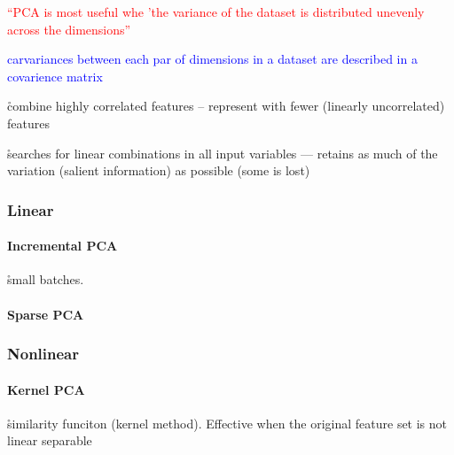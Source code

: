 \textcolor{red}{``PCA is most useful whe 'the variance of the dataset is distributed unevenly across the dimensions'' }

\textcolor{blue}{carvariances between each par of dimensions in a dataset are described in a {covarience matrix} }

\r{combine highly correlated features -- represent with fewer (linearly uncorrelated) features}

\r{searches for linear combinations in all input variables --- retains as much of the variation (salient information) as possible (some is lost)}



\subsubsection{Linear}

\paragraph{Incremental PCA}

\r{small batches.}

\paragraph{Sparse PCA}


\subsubsection{Nonlinear}

\paragraph{Kernel PCA}


\r{similarity funciton (kernel method). Effective when the original feature set is not linear separable}


